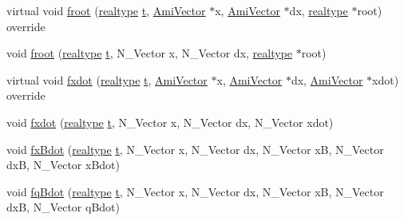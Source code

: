 \begin{DoxyCompactItemize}
\item 
virtual void \mbox{\hyperlink{classamici_1_1_model___d_a_e_a94a623b51fd0ecd7a9a549eb7da2fc04}{froot}} (\mbox{\hyperlink{namespaceamici_a1bdce28051d6a53868f7ccbf5f2c14a3}{realtype}} \mbox{\hyperlink{classamici_1_1_model_a711281d57e9710226face29151cc4641}{t}}, \mbox{\hyperlink{classamici_1_1_ami_vector}{Ami\+Vector}} $\ast$x, \mbox{\hyperlink{classamici_1_1_ami_vector}{Ami\+Vector}} $\ast$dx, \mbox{\hyperlink{namespaceamici_a1bdce28051d6a53868f7ccbf5f2c14a3}{realtype}} $\ast$root) override
\item 
void \mbox{\hyperlink{classamici_1_1_model___d_a_e_ae6c3d021c2ba942652b6dbd4355e8968}{froot}} (\mbox{\hyperlink{namespaceamici_a1bdce28051d6a53868f7ccbf5f2c14a3}{realtype}} \mbox{\hyperlink{classamici_1_1_model_a711281d57e9710226face29151cc4641}{t}}, N\+\_\+\+Vector x, N\+\_\+\+Vector dx, \mbox{\hyperlink{namespaceamici_a1bdce28051d6a53868f7ccbf5f2c14a3}{realtype}} $\ast$root)
\item 
virtual void \mbox{\hyperlink{classamici_1_1_model___d_a_e_a33461bc9bc047e838607d958eb29621a}{fxdot}} (\mbox{\hyperlink{namespaceamici_a1bdce28051d6a53868f7ccbf5f2c14a3}{realtype}} \mbox{\hyperlink{classamici_1_1_model_a711281d57e9710226face29151cc4641}{t}}, \mbox{\hyperlink{classamici_1_1_ami_vector}{Ami\+Vector}} $\ast$x, \mbox{\hyperlink{classamici_1_1_ami_vector}{Ami\+Vector}} $\ast$dx, \mbox{\hyperlink{classamici_1_1_ami_vector}{Ami\+Vector}} $\ast$xdot) override
\item 
void \mbox{\hyperlink{classamici_1_1_model___d_a_e_a5c4a9276e3053be8f0ad12cb91761647}{fxdot}} (\mbox{\hyperlink{namespaceamici_a1bdce28051d6a53868f7ccbf5f2c14a3}{realtype}} \mbox{\hyperlink{classamici_1_1_model_a711281d57e9710226face29151cc4641}{t}}, N\+\_\+\+Vector x, N\+\_\+\+Vector dx, N\+\_\+\+Vector xdot)
\item 
void \mbox{\hyperlink{classamici_1_1_model___d_a_e_acc0b085abdde1955773d61f3e3bac21b}{fx\+Bdot}} (\mbox{\hyperlink{namespaceamici_a1bdce28051d6a53868f7ccbf5f2c14a3}{realtype}} \mbox{\hyperlink{classamici_1_1_model_a711281d57e9710226face29151cc4641}{t}}, N\+\_\+\+Vector x, N\+\_\+\+Vector dx, N\+\_\+\+Vector xB, N\+\_\+\+Vector dxB, N\+\_\+\+Vector x\+Bdot)
\item 
void \mbox{\hyperlink{classamici_1_1_model___d_a_e_ae3dc4629c9c56a4af01350b8c49f49a8}{fq\+Bdot}} (\mbox{\hyperlink{namespaceamici_a1bdce28051d6a53868f7ccbf5f2c14a3}{realtype}} \mbox{\hyperlink{classamici_1_1_model_a711281d57e9710226face29151cc4641}{t}}, N\+\_\+\+Vector x, N\+\_\+\+Vector dx, N\+\_\+\+Vector xB, N\+\_\+\+Vector dxB, N\+\_\+\+Vector q\+Bdot)

\end{DoxyCompactItemize}
